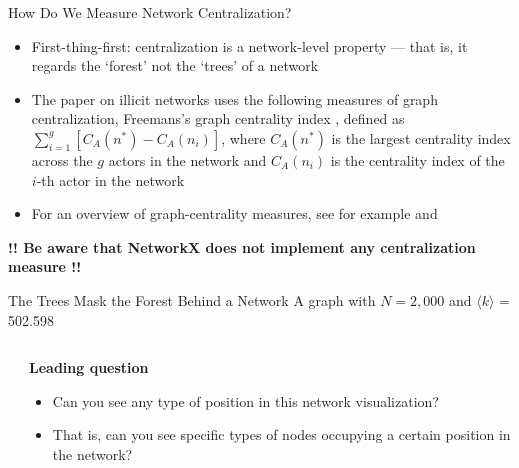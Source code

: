 \documentclass[notes, aspectratio=1610]{beamer}
\begin{document}
\begin{frame}{How Do We Measure Network Centralization?}{}
	\begin{itemize}
		\item First-thing-first: centralization is a network-level 
		property --- that is, it regards the `forest' not the `trees'
		of a network
		\item The paper on illicit networks uses the following measures 
		of graph centralization, Freemans's graph centrality index \cite{freeman1979}
		, defined as $\sum_{i=1}^{g}[C_{A}(n^{*}) - C_{A}(n_{i})]$,
		where $C_{A}(n^{*})$ is the largest centrality index across 
		the $g$ actors in the network and $C_{A}(n_{i})$ is the
		centrality index of the $i$-th actor in the network
		\item For an overview of graph-centrality measures, see for 
		example \cite{borgatti_everett2006} and \cite[][pages 176-177]{wasserman_faust1994}
	\end{itemize}

	\vspace{2em}

	\textbf{\small !! Be aware that NetworkX does not implement any centralization 
	measure !!}
\end{frame}

\begin{frame}{The Trees Mask the Forest Behind a Network}
	{A graph with $N = 2,000$ and $\langle k \rangle$ = 502.598 }
	\begin{columns}
		\begin{column}{0.5\textwidth}
			\centering 
			

		\end{column}
		\begin{column}{0.3\textwidth}
			\textbf{Leading question}

			\begin{itemize}
				\item 
				Can you see any type of position in this 
				network visualization?
				\item That is, can you see specific types of nodes 
				occupying a certain position in the network?
			\end{itemize}
		\end{column}
	\end{columns}
\end{frame}
\end{document}
